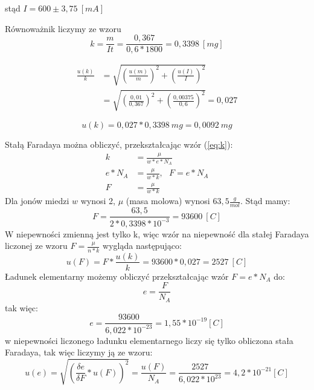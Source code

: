 \documentclass[a4paper,10pt,twoside]{article}
\begin{document}
\noindent
stąd $I=600\pm 3,75~[mA]$

\vspace{10pt}
\noindent
Równoważnik liczymy ze wzoru
$$k=\frac{m}{It}=\frac{0,367}{0,6*1800}=0,3398~[mg]$$

\begin{align*}
	\frac{u(k)}{k} &= \sqrt{ \left(\frac{u(m)}{m} \right)^2 + \left(\frac{u(I)}{I} \right )^2 } \\
	&= \sqrt{ \left(\frac{0,01}{0,367} \right)^2 + \left(\frac{0,00375}{0,6} \right )^2 }=0,027
\end{align*}

$$u(k) = 0,027 * 0,3398~mg = 0,0092~mg$$

\noindent
Stałą Faradaya można obliczyć, przekształcając wzór (\ref{eq:k}):
\begin{align*}
	k&=\frac{\mu}{w*e*N_A} \\
	e*N_A&=\frac{\mu}{w*k},~~~F = e*N_A \\
	F&=\frac{\mu}{w*k}
\end{align*}
Dla jonów miedzi  $w$ wynosi 2, $\mu$ (masa molowa) wynosi $63,5\frac{g}{mol}$. Stąd mamy:
$$F=\frac{63,5}{2*0,3398*10^{-3}}=93600~[C]$$
W niepewności zmienną jest tylko k, więc wzór na niepewność dla stałej Faradaya liczonej ze wzoru $F=\frac{\mu}{n*k}$ wygląda następująco:
$$u(F)=F*\frac{u(k)}{k}=93600*0,027=2527~[C]$$
Ładunek elementarny możemy obliczyć przekształcając wzór $F=e*N_A$ do:
$$e=\frac{F}{N_A}$$
tak więc:
$$e=\frac{93600}{6,022*10^{-23}}=1,55*10^{-19}[C]$$
w niepewności liczonego ładunku elementarnego liczy się tylko obliczona stała Faradaya, tak więc liczymy ją ze wzoru:
$$u(e)=\sqrt{\left(\frac{\delta e}{\delta F}*u(F) \right)^2}=\frac{u(F)}{N_A}=\frac{2527}{6,022*10^{23}}=4,2*10^{-21}[C]$$


\newpage
\end{document}
